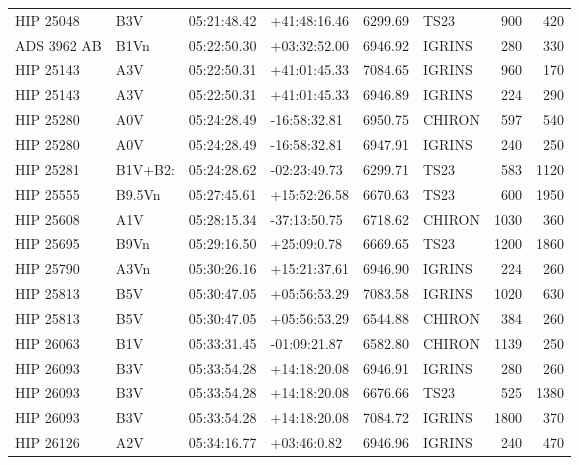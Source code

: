 \documentclass{emulateapj}
\begin{document}
\begin{longtable*}{|l|lllrlrr|}
   HIP 25048 &            B3V &    05:21:48.42 &   +41:48:16.46 &  6299.69 &       TS23 &      900 &     420 \\
 ADS 3962 AB &           B1Vn &    05:22:50.30 &   +03:32:52.00 &  6946.92 &     IGRINS &      280 &     330 \\
   HIP 25143 &            A3V &    05:22:50.31 &   +41:01:45.33 &  7084.65 &     IGRINS &      960 &     170 \\
   HIP 25143 &            A3V &    05:22:50.31 &   +41:01:45.33 &  6946.89 &     IGRINS &      224 &     290 \\
   HIP 25280 &            A0V &    05:24:28.49 &   -16:58:32.81 &  6950.75 &     CHIRON &      597 &     540 \\
   HIP 25280 &            A0V &    05:24:28.49 &   -16:58:32.81 &  6947.91 &     IGRINS &      240 &     250 \\
   HIP 25281 &        B1V+B2: &    05:24:28.62 &   -02:23:49.73 &  6299.71 &       TS23 &      583 &    1120 \\
   HIP 25555 &         B9.5Vn &    05:27:45.61 &   +15:52:26.58 &  6670.63 &       TS23 &      600 &    1950 \\
   HIP 25608 &            A1V &    05:28:15.34 &   -37:13:50.75 &  6718.62 &     CHIRON &     1030 &     360 \\
   HIP 25695 &           B9Vn &    05:29:16.50 &    +25:09:0.78 &  6669.65 &       TS23 &     1200 &    1860 \\
   HIP 25790 &           A3Vn &    05:30:26.16 &   +15:21:37.61 &  6946.90 &     IGRINS &      224 &     260 \\
   HIP 25813 &            B5V &    05:30:47.05 &   +05:56:53.29 &  7083.58 &     IGRINS &     1020 &     630 \\
   HIP 25813 &            B5V &    05:30:47.05 &   +05:56:53.29 &  6544.88 &     CHIRON &      384 &     260 \\
   HIP 26063 &            B1V &    05:33:31.45 &   -01:09:21.87 &  6582.80 &     CHIRON &     1139 &     250 \\
   HIP 26093 &            B3V &    05:33:54.28 &   +14:18:20.08 &  6946.91 &     IGRINS &      280 &     260 \\
   HIP 26093 &            B3V &    05:33:54.28 &   +14:18:20.08 &  6676.66 &       TS23 &      525 &    1380 \\
   HIP 26093 &            B3V &    05:33:54.28 &   +14:18:20.08 &  7084.72 &     IGRINS &     1800 &     370 \\
   HIP 26126 &            A2V &    05:34:16.77 &    +03:46:0.82 &  6946.96 &     IGRINS &      240 &     470 \\

\end{longtable*}
\end{document}
